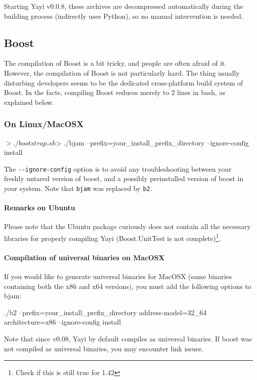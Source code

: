 Starting Yayi v0.0.8, these archives are decompressed automatically during the building process (indirectly uses Python), so no manual intervention is needed.

\subsection{Boost}
\label{sub:thirdparties:boost}
The compilation of Boost is a bit tricky, and people are often afraid of it. However, the compilation of Boost is not particularly hard. The thing usually disturbing developers seems to be the dedicated cross-platform build system of Boost. In the facts, compiling Boost reduces merely to 2 lines in bash, as explained below. 


\subsubsection{On Linux/MacOSX}
\begin{bash}
$> ./bootstrap.sh
$> ./bjam --prefix=your_install_prefix_directory --ignore-config install
\end{bash}

The \lstinline|--ignore-config| option is to avoid any troubleshooting between your freshly untared version of boost, and a possibly preinstalled version of boost in your system. 
Note that \lstinline|bjam| was replaced by \lstinline|b2|. 

\paragraph{Remarks on Ubuntu} Please note that the Ubuntu package curiously does not contain all the necessary libraries for properly compiling Yayi (Boost.UnitTest is not complete)\footnote{Check if this is still true for 1.42}. 

\paragraph{Compilation of universal binaries on MacOSX}

If you would like to generate universal binaries for MacOSX (same binaries containing both the x86 and x64 versions), you must add the following options to bjam:
\begin{bash}
./b2 --prefix=your_install_prefix_directory address-model=32_64 architecture=x86 --ignore-config install
\end{bash}

Note that since v0.08, Yayi by default compiles as universal binaries. If boost was not compiled as universal binaries, you may encounter link issues.


